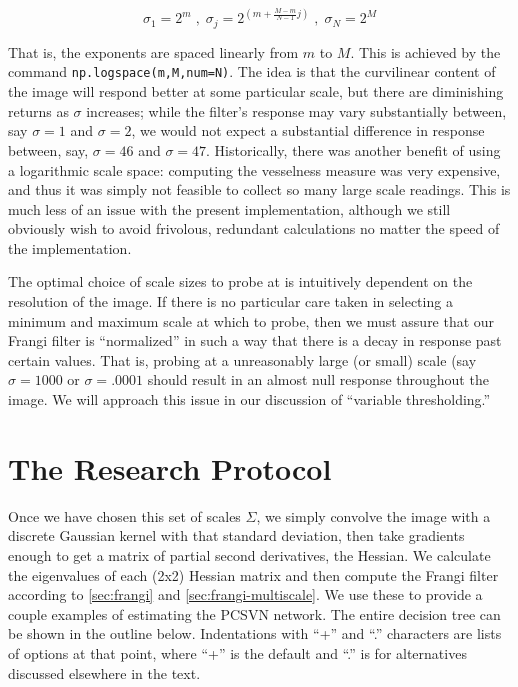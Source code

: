     \begin{equation}
    \sigma_1 = 2^{m} \; , \; \sigma_{j} = 2^{\left(m+\frac{M-m}{N-1}j\right)} \; , \; \sigma_N = 2^{M} \end{equation}
    
    That is, the exponents are spaced linearly from $m$ to $M$. This is achieved by the command
    \texttt{np.logspace(m,M,num=N)}. The idea is that the curvilinear content of the image will respond better at some particular scale, but there are diminishing returns as $\sigma$ increases; while the filter's response may vary substantially between, say $\sigma=1$ and $\sigma=2$, we would not expect a substantial difference in response between, say, $\sigma=46$ and $\sigma=47$. Historically, there was another benefit of using a logarithmic scale space: computing the vesselness measure was very expensive, and thus it was simply not feasible to collect so many large scale readings. This is much less of an issue with the present implementation, although we still obviously wish to avoid frivolous, redundant calculations no matter the speed of the implementation.
    
    The optimal choice of scale sizes to probe at is intuitively dependent on the resolution of the image. If there is no particular care taken in selecting a minimum and maximum scale at which to probe, then we must assure that our Frangi filter is ``normalized'' in such a way that there is a decay in response past certain values. That is, probing at a unreasonably large (or small) scale (say $\sigma=1000$ or $\sigma=.0001$ should result in an almost null response throughout the image. We will approach this issue in our discussion of ``variable thresholding.'' 
    
    \section{The Research Protocol}
    Once we have chosen this set of scales $\Sigma$, we simply convolve the image with a discrete Gaussian kernel with that standard deviation, then take gradients enough to get a matrix of partial second derivatives, the Hessian. We calculate the eigenvalues of each (2x2) Hessian matrix and then compute the Frangi filter according to \cref{sec:frangi} and \cref{sec:frangi-multiscale}. We use these to provide a couple examples of estimating the PCSVN network. The entire decision tree can be shown in the outline below. Indentations with ``+'' and ``.'' characters are lists of options at that point, where ``+'' is the default and ``.'' is for alternatives discussed elsewhere in the text.
    
